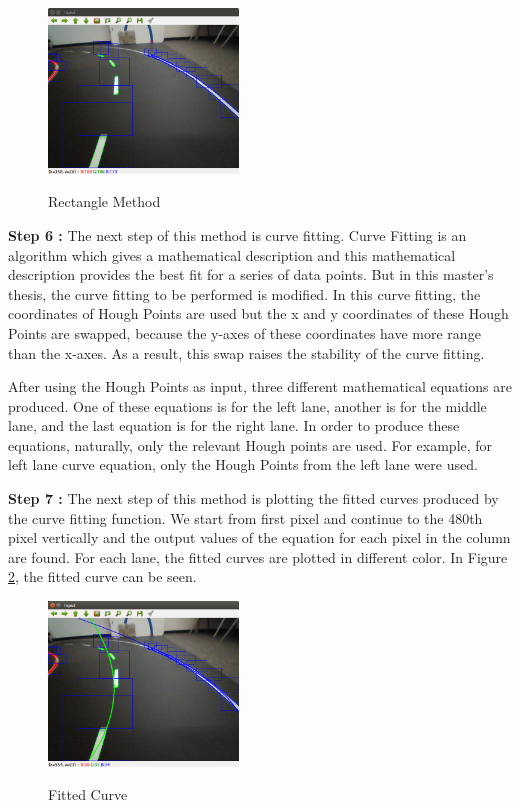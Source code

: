 \begin{figure}[H]
 \centering
  \includegraphics[width=0.45\textwidth]{./Bilder/Case1_Rectangles.png}\label{fig:Case1_Rectangles}
	\caption{Rectangle Method}
\end{figure}


\textbf{Step 6 : }The next step of this method is curve fitting. Curve Fitting is an algorithm which gives a mathematical description and this mathematical description provides the best fit for a series of data points. But in this master's thesis, the curve fitting to be performed is modified. In this curve fitting, the coordinates of Hough Points are used but the x and y coordinates of these Hough Points are swapped, because the y-axes of these coordinates have more range than the x-axes. As a result, this swap raises the stability of the curve fitting.

After using the Hough Points as input, three different mathematical equations are produced. One of these equations is for the left lane, another is for the middle lane, and the last equation is for the right lane. In order to produce these equations, naturally, only the relevant Hough points are used. For example, for left lane curve equation, only the Hough Points from the left lane were used.
 
\textbf{Step 7 : }The next step of this method is plotting the fitted curves produced by the curve fitting function. We start from first pixel and continue to the 480th pixel vertically and the output values of the equation for each pixel in the column are found. For each lane, the fitted curves are plotted in different color. In Figure \ref{fig:Case1_CurveFittingwithoutIPM.png}, the fitted curve can be seen.


\begin{figure}[H]
 \centering
  \includegraphics[width=0.45\textwidth]{./Bilder/Case1_CurveFittingwithoutIPM.png}\label{fig:Case1_CurveFittingwithoutIPM.png}
	\caption{Fitted Curve}
\end{figure}


